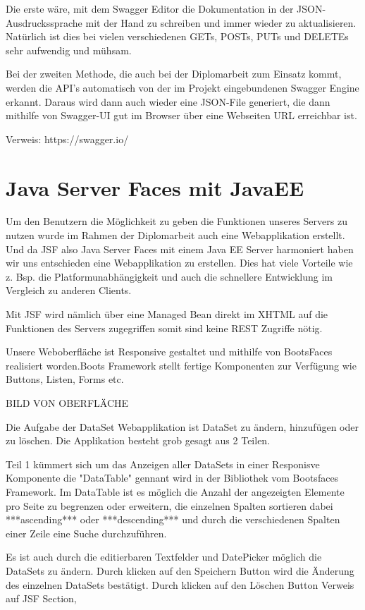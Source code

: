 Die erste wäre, mit dem Swagger Editor die Dokumentation in der JSON-Ausdruckssprache mit der Hand zu schreiben und immer wieder zu aktualisieren. Natürlich ist dies bei vielen verschiedenen GETs, POSTs, PUTs und DELETEs sehr aufwendig und mühsam.

Bei der zweiten Methode, die auch bei der Diplomarbeit zum Einsatz kommt, werden die API's automatisch von der im Projekt eingebundenen Swagger Engine erkannt. Daraus wird dann auch wieder eine JSON-File generiert, die dann mithilfe von Swagger-UI gut im Browser über eine Webseiten URL erreichbar ist.


Verweis: https://swagger.io/

\section{Java Server Faces mit JavaEE}\label{sec:javaeejsf}
Um den Benutzern die Möglichkeit zu geben die Funktionen unseres Servers zu nutzen wurde im Rahmen der Diplomarbeit auch eine Webapplikation erstellt. Und da JSF also Java Server Faces mit einem Java EE Server harmoniert haben wir  uns entschieden eine Webapplikation zu erstellen. Dies hat viele Vorteile wie z. Bsp. die Platformunabhängigkeit und auch die schnellere Entwicklung im Vergleich zu anderen Clients. 

Mit JSF wird nämlich über eine Managed Bean direkt im XHTML auf die Funktionen des Servers zugegriffen somit sind keine REST Zugriffe nötig. 

Unsere Weboberfläche ist Responsive gestaltet und mithilfe von BootsFaces realisiert worden.Boots Framework stellt fertige Komponenten zur Verfügung wie Buttons, Listen, Forms etc. 

BILD VON OBERFLÄCHE

Die Aufgabe der DataSet Webapplikation ist DataSet zu ändern, hinzufügen oder zu löschen. Die Applikation besteht grob gesagt aus 2 Teilen. 

Teil 1 kümmert sich um das Anzeigen aller DataSets in einer Responisve Komponente die "DataTable" gennant wird in der Bibliothek vom Bootsfaces Framework. Im DataTable ist es möglich die Anzahl der angezeigten Elemente pro Seite zu begrenzen oder erweitern,  die einzelnen Spalten sortieren dabei ***ascending*** oder ***descending*** und durch die verschiedenen Spalten einer Zeile eine Suche durchzuführen. 

Es ist auch durch die editierbaren Textfelder und DatePicker möglich die DataSets zu ändern. Durch klicken auf den Speichern Button wird die Änderung des einzelnen DataSets bestätigt. Durch klicken auf den Löschen Button
Verweis auf JSF Section,

